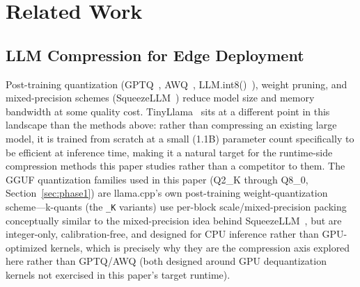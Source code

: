 \documentclass[journal]{IEEEtran}
\begin{document}
\section{Related Work}
\label{sec:related}


\subsection{LLM Compression for Edge Deployment}
Post-training quantization (GPTQ~\cite{ref4}, AWQ~\cite{ref5}, LLM.int8()~\cite{ref6}), weight pruning, and mixed-precision schemes (SqueezeLLM~\cite{ref7}) reduce model size and memory bandwidth at some quality cost. TinyLlama~\cite{ref1} sits at a different point in this landscape than the methods above: rather than compressing an existing large model, it is trained from scratch at a small (1.1B) parameter count specifically to be efficient at inference time, making it a natural target for the runtime-side compression methods this paper studies rather than a competitor to them. The GGUF quantization families used in this paper (Q2\_K through Q8\_0, Section~\ref{sec:phase1}) are llama.cpp's own post-training weight-quantization scheme---k-quants (the \texttt{\_K} variants) use per-block scale/mixed-precision packing conceptually similar to the mixed-precision idea behind SqueezeLLM~\cite{ref7}, but are integer-only, calibration-free, and designed for CPU inference rather than GPU-optimized kernels, which is precisely why they are the compression axis explored here rather than GPTQ/AWQ (both designed around GPU dequantization kernels not exercised in this paper's target runtime).
\end{document}
